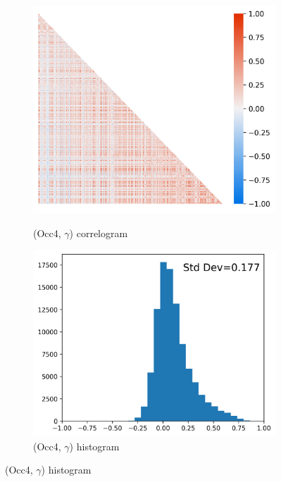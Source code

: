\documentclass[12pt]{article}
\def\g{\gamma}
\theoremstyle{definition}
\theoremstyle{plain}
\begin{document}
\begin{figure}[!htbp]
\begin{subfigure}[b]{\w\textwidth}
		\label{fig:correlograms_hist_occ4_first_recode_sector_IBGE_sorted}
	\end{subfigure}\vfill
	\begin{subfigure}[b]{\w\textwidth}
		\centering
		\caption{(Occ4, $\g$) correlogram}
		\includegraphics[height=.25\textheight]{../Results/correlograms_occ4_first_recode_gamma_sorted}
		\label{fig:correlograms_occ4_first_recode_gamma_sorted}
	\end{subfigure}\hfill
	\begin{subfigure}[b]{\w\textwidth}
		\centering
		\caption{(Occ4, $\g$) histogram}
		\includegraphics[height=.25\textheight]{../Results/correlograms_hist_occ4_first_recode_gamma_sorted}

\end{subfigure}
\end{figure}
\end{document}
